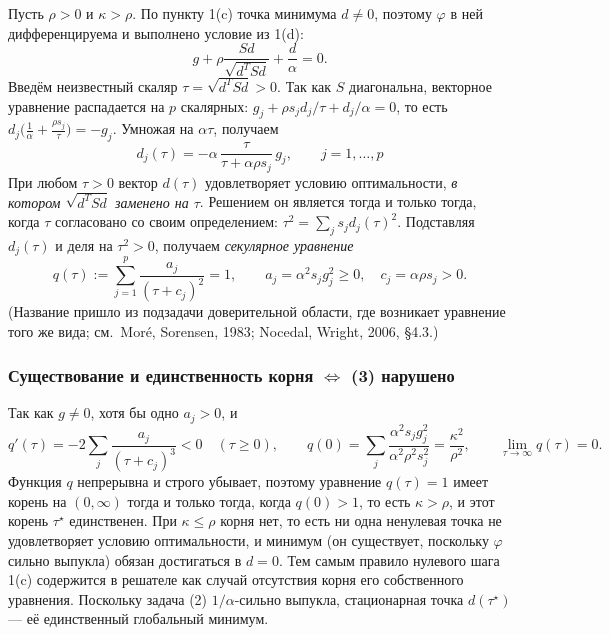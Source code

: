 \documentclass[11pt,a4paper]{article}
\begin{document}
Пусть $\rho>0$ и $\kappa>\rho$. По пункту 1(c) точка минимума $d\neq0$, поэтому
$\varphi$ в ней дифференцируема и выполнено условие из 1(d):
\begin{equation*}
g+\rho\frac{Sd}{\sqrt{d^TSd}}+\frac d\alpha=0 .
\end{equation*}
Введём неизвестный скаляр $\tau=\sqrt{d^TSd}>0$. Так как $S$ диагональна, векторное
уравнение распадается на $p$ скалярных: $g_j+\rho s_jd_j/\tau+d_j/\alpha=0$, то есть
$d_j\big(\tfrac1\alpha+\tfrac{\rho s_j}{\tau}\big)=-g_j$. Умножая на $\alpha\tau$,
получаем
\begin{equation*}
\boxed{\;d_j(\tau)=-\alpha\,\frac{\tau}{\tau+\alpha\rho s_j}\,g_j,\qquad j=1,\dots,p\;}
\end{equation*}
При любом $\tau>0$ вектор $d(\tau)$ удовлетворяет условию оптимальности, \emph{в
котором $\sqrt{d^TSd}$ заменено на $\tau$}. Решением он является тогда и только тогда,
когда $\tau$ согласовано со своим определением: $\tau^2=\sum_js_jd_j(\tau)^2$.
Подставляя $d_j(\tau)$ и деля на $\tau^2>0$, получаем \emph{секулярное уравнение}
\begin{equation*}
q(\tau):=\sum_{j=1}^p\frac{a_j}{(\tau+c_j)^2}=1,\qquad
a_j=\alpha^2s_jg_j^2\ge0,\quad c_j=\alpha\rho s_j>0 .
\end{equation*}
(Название пришло из подзадачи доверительной области, где возникает уравнение того же
вида; см.\ Moré, Sorensen, 1983; Nocedal, Wright, 2006, §4.3.)

\subsubsection*{Существование и единственность корня $\Longleftrightarrow$ (3) нарушено}

Так как $g\ne0$, хотя бы одно $a_j>0$, и
\begin{equation*}
q'(\tau)=-2\sum_j\frac{a_j}{(\tau+c_j)^3}<0\quad(\tau\ge0),\qquad
q(0)=\sum_j\frac{\alpha^2s_jg_j^2}{\alpha^2\rho^2s_j^2}=\frac{\kappa^2}{\rho^2},\qquad
\lim_{\tau\to\infty}q(\tau)=0 .
\end{equation*}
Функция $q$ непрерывна и строго убывает, поэтому уравнение $q(\tau)=1$ имеет корень на
$(0,\infty)$ тогда и только тогда, когда $q(0)>1$, то есть $\kappa>\rho$, и этот корень
$\tau^\star$ единственен. При $\kappa\le\rho$ корня нет, то есть ни одна ненулевая
точка не удовлетворяет условию оптимальности, и минимум (он существует, поскольку
$\varphi$ сильно выпукла) обязан достигаться в $d=0$. Тем самым правило нулевого шага
1(c) содержится в решателе как случай отсутствия корня его собственного уравнения.
Поскольку задача (2) $1/\alpha$-сильно выпукла, стационарная точка $d(\tau^\star)$ —
её единственный глобальный минимум.
\end{document}
